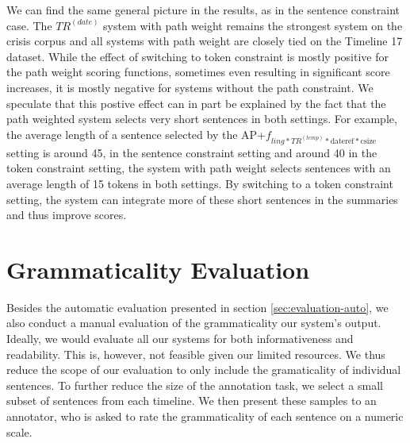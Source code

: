 \documentclass[a4paper,BCOR=10mm]{report}
\numberwithin{lemma}{chapter}
\numberwithin{definition}{chapter}
\begin{document}
We can find the same general picture in the results, as in the sentence constraint case. The $TR^{(date)}$ system with path weight remains the strongest system on the crisis corpus and all systems with path weight are closely tied on the Timeline 17 dataset.
While the effect of switching to token constraint is mostly positive for the path weight scoring functions, sometimes even resulting in significant score increases, it is mostly negative for systems without the path constraint. We speculate that this postive effect can in part be explained by the fact that the path weighted system selects very short sentences in both settings.
For example, the average length of a sentence selected by the AP+$f_{ling*TR^{(temp)}*\text{dateref}*\text{csize}}$ setting is around 45, in the sentence constraint setting and around 40 in the token constraint setting, the system with path weight selects sentences with an average length of 15 tokens in both settings.
By switching to a token constraint setting, the system can integrate more of these short sentences in the summaries and thus improve scores.


%

\chapter{Grammaticality Evaluation} \label{sec:results-manual}

Besides the automatic evaluation presented in section \ref{sec:evaluation-auto}, we also conduct a manual evaluation of the grammaticality our system's output.
Ideally, we would evaluate all our systems for both informativeness and readability. This is, however, not feasible given our limited resources.
We thus reduce the scope of our evaluation to only include the gramaticality of individual sentences.
To further reduce the size of the annotation task, we select a small subset of sentences from each timeline.
We then present these samples to an annotator, who is asked to rate the grammaticality of each sentence on a numeric scale.
\end{document}
